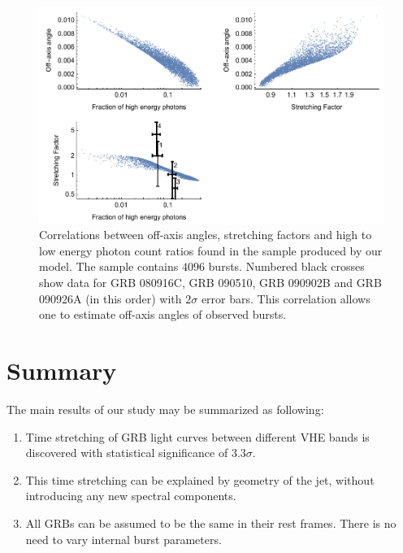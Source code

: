 \documentclass{article}
\begin{document}
\begin{figure}
        \centering
        \includegraphics[width=1.0\textwidth]{correlations}
        \caption{
        	Correlations between off-axis angles, stretching factors and high to low energy photon count ratios found in the sample produced by our model.
        	The sample contains $4096$ bursts.
        	Numbered black crosses show data for GRB 080916C, GRB 090510, GRB 090902B and GRB 090926A (in this order) with $2\sigma$ error bars.
        	This correlation allows one to estimate off-axis angles of observed bursts.
        }
        \label{fig:correlations}
\end{figure}

\section{Summary}

\label{sec:summary}

	The main results of our study may be summarized as following:
	\begin{enumerate}
		\item{
			Time stretching of GRB light curves between different VHE bands is discovered with statistical significance of $3.3\sigma$.
		}
		\item{
			This time stretching can be explained by geometry of the jet, without introducing any new spectral components.
		}
		\item{
			All GRBs can be assumed to be the same in their rest frames.
			There is no need to vary internal burst parameters.
		}
	\end{enumerate}
\end{document}
